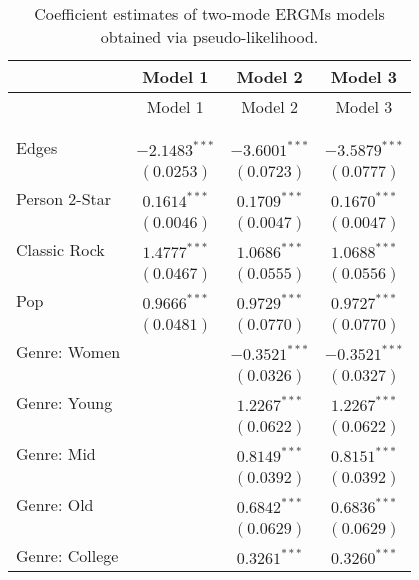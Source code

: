 
\begin{center}
\begin{longtable}{l c c c}
\toprule
 & Model 1 & Model 2 & Model 3 \\
\midrule
\endfirsthead
\toprule
 & Model 1 & Model 2 & Model 3 \\
\midrule
\endhead
\bottomrule
\endfoot
\bottomrule
\multicolumn{4}{l}{\scriptsize{$^{***}p<0.001$; $^{**}p<0.01$; $^{*}p<0.05$}}\\
\caption{Coefficient estimates of two-mode ERGMs models obtained via pseudo-likelihood.}
\label{tab:reg1}
\endlastfoot \\
Edges                & $-2.1483^{***}$ & $-3.6001^{***}$ & $-3.5879^{***}$ \\
                     & $(0.0253)$      & $(0.0723)$      & $(0.0777)$      \\
Person 2-Star        & $0.1614^{***}$  & $0.1709^{***}$  & $0.1670^{***}$  \\
                     & $(0.0046)$      & $(0.0047)$      & $(0.0047)$      \\
Classic Rock         & $1.4777^{***}$  & $1.0686^{***}$  & $1.0688^{***}$  \\
                     & $(0.0467)$      & $(0.0555)$      & $(0.0556)$      \\
Pop                  & $0.9666^{***}$  & $0.9729^{***}$  & $0.9727^{***}$  \\
                     & $(0.0481)$      & $(0.0770)$      & $(0.0770)$      \\
Genre: Women         &                 & $-0.3521^{***}$ & $-0.3521^{***}$ \\
                     &                 & $(0.0326)$      & $(0.0327)$      \\
Genre: Young         &                 & $1.2267^{***}$  & $1.2267^{***}$  \\
                     &                 & $(0.0622)$      & $(0.0622)$      \\
Genre: Mid           &                 & $0.8149^{***}$  & $0.8151^{***}$  \\
                     &                 & $(0.0392)$      & $(0.0392)$      \\
Genre: Old           &                 & $0.6842^{***}$  & $0.6836^{***}$  \\
                     &                 & $(0.0629)$      & $(0.0629)$      \\
Genre: College       &                 & $0.3261^{***}$  & $0.3260^{***}$  \\

\end{longtable}
\end{center}
